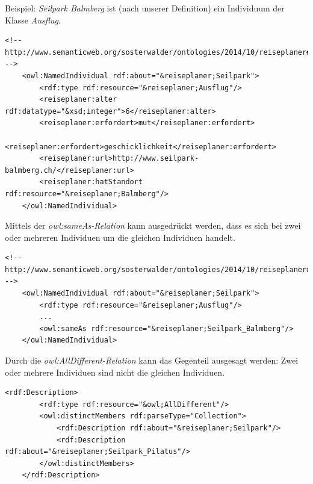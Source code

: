 Beispiel: \textit{Seilpark Balmberg} ist (nach unserer Definition) ein Individuum der Klasse \textit{Ausflug}. 

\begin{lstlisting}[caption={Beispiel eines Individuums}]
    <!-- http://www.semanticweb.org/sosterwalder/ontologies/2014/10/reiseplaner#Seilpark -->
    <owl:NamedIndividual rdf:about="&reiseplaner;Seilpark">
        <rdf:type rdf:resource="&reiseplaner;Ausflug"/>
        <reiseplaner:alter rdf:datatype="&xsd;integer">6</reiseplaner:alter>
        <reiseplaner:erfordert>mut</reiseplaner:erfordert>
        <reiseplaner:erfordert>geschicklichkeit</reiseplaner:erfordert>
        <reiseplaner:url>http://www.seilpark-balmberg.ch/</reiseplaner:url>
        <reiseplaner:hatStandort rdf:resource="&reiseplaner;Balmberg"/>
    </owl:NamedIndividual>
\end{lstlisting}

\newpage

Mittels der \textit{owl:sameAs-Relation} kann ausgedrückt werden, dass es sich bei zwei oder mehreren Individuen um die gleichen Individuen handelt.

\begin{lstlisting}[caption={Beispiel einer Gleichstellung von Individuen: Seilpark und Seilpark-Balmberg sind das gleiche Individuum}]
    <!-- http://www.semanticweb.org/sosterwalder/ontologies/2014/10/reiseplaner#Seilpark -->
    <owl:NamedIndividual rdf:about="&reiseplaner;Seilpark">
        <rdf:type rdf:resource="&reiseplaner;Ausflug"/>
        ...
        <owl:sameAs rdf:resource="&reiseplaner;Seilpark_Balmberg"/>
    </owl:NamedIndividual>
\end{lstlisting}


Durch die \textit{owl:AllDifferent-Relation} kann das Gegenteil ausgesagt werden:  Zwei oder mehrere Individuen sind nicht die gleichen Individuen.

\begin{lstlisting}[caption={Beispiel einer Differenzierung von Individuen: Seilpark ist nicht das gleiche Individuum wie Seilpark-Pilatus}]
    <rdf:Description>
        <rdf:type rdf:resource="&owl;AllDifferent"/>
        <owl:distinctMembers rdf:parseType="Collection">
            <rdf:Description rdf:about="&reiseplaner;Seilpark"/>
            <rdf:Description rdf:about="&reiseplaner;Seilpark_Pilatus"/>
        </owl:distinctMembers>
    </rdf:Description>

\end{lstlisting}

